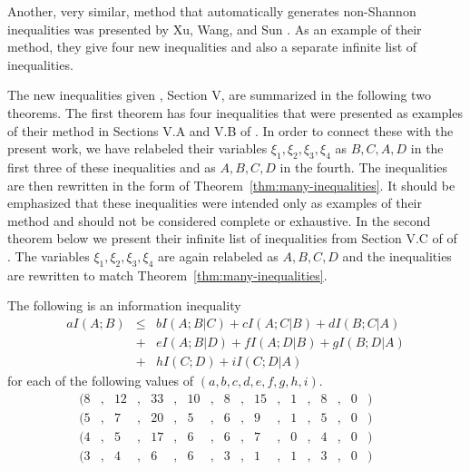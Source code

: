 \documentclass[10pt,journal]{IEEEtran}
\begin{document}
Another, very similar, method that automatically generates non-Shannon inequalities was
presented by Xu, Wang, and Sun \cite{XuWangSun}.  As an example of their method,
they give four new inequalities and also a separate infinite list of inequalities.

The new inequalities given \cite{XuWangSun}, Section V, are summarized in the
following two theorems.  The first theorem has four inequalities that were presented as
examples of their method in Sections V.A and V.B of \cite{XuWangSun}.
In order to connect these with the present work,
we have relabeled their variables $\xi_1, \xi_2, \xi_3, \xi_4$ as
$B,C,A,D$ in the first three of these inequalities and as $A,B,C,D$ in the fourth.
The inequalities are then rewritten in the form of Theorem~\ref{thm:many-inequalities}.
It should be emphasized that these inequalities were intended only as examples of their method
and should not be considered complete or exhaustive.  In the second theorem below we present their
infinite list of inequalities from Section V.C of of \cite{XuWangSun}.
The variables $\xi_1, \xi_2, \xi_3, \xi_4$
are again relabeled as $A,B,C,D$ and the inequalities are rewritten to match Theorem~\ref{thm:many-inequalities}.

\begin{theorem}\label{thXWS1}
The following is an information inequality
\begin{eqnarray*}
aI(A;B) &\leq& bI(A;B|C) + cI(A;C|B) + dI(B;C|A) \\
      &+&  eI(A;B|D) + fI(A;D|B)+ gI(B;D|A)\\
      &+& hI(C;D) +iI(C;D|A)
\end{eqnarray*}
for each of the following values of $(a,b,c,d,e,f,g,h,i)$.
\begin{align}
&&(8&,&12&,&33&,&10&,&8&,&15&,&1&,&8&,&0&)&&&& \label{XWS1}\\
&&(5&,&7&,&20&,&5&,&6&,&9&,&1&,&5&,&0&)&&&& \label{XWS2}\\
&&(4&,&5&,&17&,&6&,&6&,&7&,&0&,&4&,&0&)&&&& \label{XWS3}\\
&&(3&,&4&,&6&,&6&,&3&,&1&,&1&,&3&,&0&)&&&& \label{XWS4}
\end{align}
\end{theorem}
\end{document}
